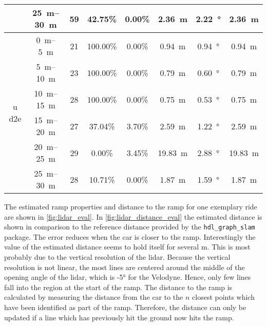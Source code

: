 \begin{table}[htbp]
\begin{tabular}[t]{cccccccc}
		                       & \SIrange{25}{30}{\metre} & 59              & 42.75\%        & 0.00\%         & \SI{2.36}{\metre}  & \SI{2.22}{\degree}     & \SI{2.36}{\metre}  \\
		\hline
		\multirow{6}{*}{u d2e} & \SIrange{0}{5}{\metre}   & 21              & 100.00\%       & 0.00\%         & \SI{0.94}{\metre}  & \SI{0.94}{\degree}     & \SI{0.94}{\metre}  \\
		                       & \SIrange{5}{10}{\metre}  & 23              & 100.00\%       & 0.00\%         & \SI{0.79}{\metre}  & \SI{0.60}{\degree}     & \SI{0.79}{\metre}  \\
		                       & \SIrange{10}{15}{\metre} & 28              & 100.00\%       & 0.00\%         & \SI{0.75}{\metre}  & \SI{0.53}{\degree}     & \SI{0.75}{\metre}  \\
		                       & \SIrange{15}{20}{\metre} & 27              & 37.04\%        & 3.70\%         & \SI{2.59}{\metre}  & \SI{1.22}{\degree}     & \SI{2.59}{\metre}  \\
		                       & \SIrange{20}{25}{\metre} & 29              & 0.00\%         & 3.45\%         & \SI{19.83}{\metre} & \SI{2.88}{\degree}     & \SI{19.83}{\metre} \\
		                       & \SIrange{25}{30}{\metre} & 28              & 10.71\%        & 0.00\%         & \SI{1.87}{\metre}  & \SI{1.59}{\degree}     & \SI{1.87}{\metre}  \\
		\bottomrule
	\end{tabular}
\end{table}
The estimated ramp properties and distance to the ramp for one exemplary ride are shown in \cref{fig:lidar_eval}.
In \cref{fig:lidar_distance_eval} the estimated distance is shown in comparison to the reference distance provided by the \texttt{hdl\_graph\_slam} package.
The error reduces when the car is closer to the ramp.
Interestingly the value of the estimated distance seems to hold itself for several \si{\metre}.
This is most probably due to the vertical resolution of the \gls{lidar}.
Because the vertical resolution is not linear, the most lines are centered around the middle of the opening angle of the \gls{lidar}, which is -\ang{5} for the Velodyne.
Hence, only few lines fall into the region at the start of the ramp.
The distance to the ramp is calculated by measuring the distance from the car to the $n$ closest points which have been identified as part of the ramp.
Therefore, the distance can only be updated if a line which has previously hit the ground now hits the ramp.\\
